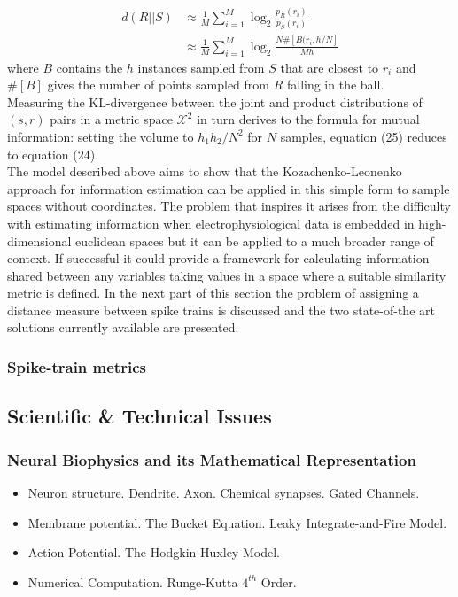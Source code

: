 \documentclass[12pt]{extarticle}
\begin{document}
\begin{equation}
\begin{aligned}
d(R||S) &\approx \frac{1}{M} \sum_{i=1}^{M} \log_2 \frac{p_R(r_i)}{p_S(r_i)}\\
		&\approx \frac{1}{M} \sum_{i=1}^{M} \log_2 \frac{N\#[B(r_i,h/N]}{Mh}
\end{aligned}
\end{equation}
where $B$ contains the $h$ instances sampled from $S$ that are closest to $r_i$ and $\#[B]$ gives the number of points sampled from $R$ falling in the ball.\\

\noindent
Measuring the KL-divergence between the joint and product distributions of $(s,r)$ pairs in a metric space $\mathcal{X}^2$ in turn derives to the formula for mutual information: setting the volume to $h_1h_2/N^2$ for $N$ samples, equation (25) reduces to equation (24).\\

\noindent
The model described above aims to show that the Kozachenko-Leonenko approach for information estimation can be applied in this simple form to sample spaces without coordinates. The problem that inspires it arises from the difficulty with estimating information when electrophysiological data is embedded in high-dimensional euclidean spaces but it can be applied to a much broader range of context. If successful it could provide a framework for calculating information shared between any variables taking values in a space where a suitable similarity metric is defined. In the next part of this section the problem of assigning a distance measure between spike trains is discussed and the two state-of-the art solutions currently available are presented.\\

\subsubsection*{Spike-train metrics}









\newpage

\subsection*{Scientific \& Technical Issues}
\subsubsection*{Neural Biophysics and its Mathematical Representation \cite{NEUR}}
\begin{itemize}
\item Neuron structure. Dendrite. Axon. Chemical synapses. Gated Channels.
\item Membrane potential. The Bucket Equation. Leaky Integrate-and-Fire Model.
\item Action Potential. The Hodgkin-Huxley Model.
\item Numerical Computation. Runge-Kutta $4^{th}$ Order.
\end{itemize}
\end{document}
